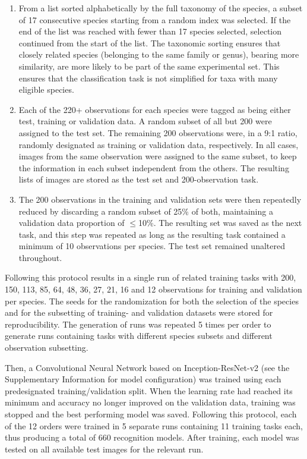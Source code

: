 \documentclass{article}
\begin{document}
\begin{enumerate}
\item From a list sorted alphabetically by the full taxonomy of the species, a subset of 17 consecutive species starting from a random index was selected. If the end of the list was reached with fewer than 17 species selected, selection continued from the start of the list. The taxonomic sorting ensures that closely related species (belonging to the same family or genus), bearing more similarity, are more likely to be part of the same experimental set. This ensures that the classification task is not simplified for taxa with many eligible species.
\item Each of the 220+ observations for each species were tagged as being either test, training or validation data. A random subset of all but 200 were assigned to the test set. The remaining 200 observations were, in a 9:1 ratio, randomly designated as training or validation data, respectively. In all cases, images from the same observation were assigned to the same subset, to keep the information in each subset independent from the others. The resulting lists of images are stored as the test set and 200-observation task.
\item The 200 observations in the training and validation sets were then repeatedly reduced by discarding a random subset of 25\% of both, maintaining a validation data proportion of \(\leq\)10\%. The resulting set was saved as the next task, and this step was repeated as long as the resulting task contained a minimum of 10 observations per species. The test set remained unaltered throughout.
\end{enumerate}

Following this protocol results in a single run of related training tasks with 200, 150, 113, 85, 64, 48, 36, 27, 21, 16 and 12 observations for training and validation per species. The seeds for the randomization for both the selection of the species and for the subsetting of training- and validation datasets were stored for reproducibility. The generation of runs was repeated 5 times per order to generate runs containing tasks with different species subsets and different observation subsetting.

Then, a Convolutional Neural Network based on Inception-ResNet-v2\autocite{szegedy2016inceptionv4} (see the Supplementary Information for model configuration) was trained using each predesignated training/validation split. When the learning rate had reached its minimum and accuracy no longer improved on the validation data, training was stopped and the best performing model was saved. Following this protocol, each of the 12 orders were trained in 5 separate runs containing 11 training tasks each, thus producing a total of 660 recognition models. After training, each model was tested on all available test images for the relevant run.
\end{document}
